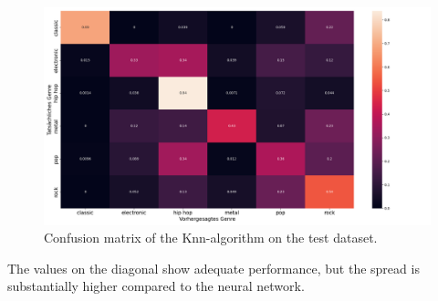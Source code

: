 \documentclass[
  12pt,
  bibliography=totoc,     %
  captions=tableheading,  %
  titlepage=firstiscover, %
]{scrartcl}
\begin{document}
\begin{figure}[H]
  \centering
  \includegraphics[scale=0.33]{figures/knn/confusion_matrix_knn.png}
  \caption{Confusion matrix of the Knn-algorithm on the test dataset.}
  \label{fig:conf_knn}
\end{figure}
\noindent
The values on the diagonal show adequate performance, but the spread is substantially higher compared to the neural network.
\end{document}
